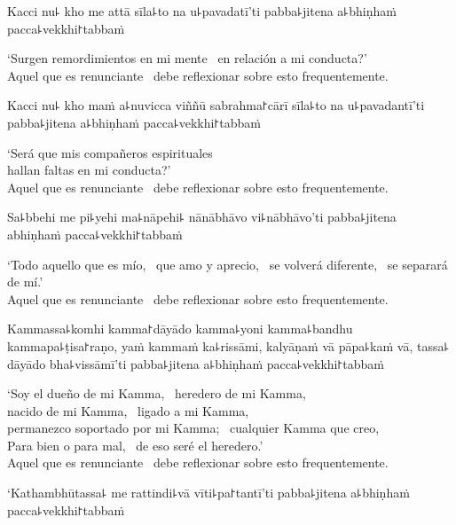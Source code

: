 \clearpage

Kacci nu꜕ kho me attā sīla꜕to na u꜕pavadatī'ti pabba꜕jitena a꜕bhiṇhaṁ pacca꜕vekkhi꜓tabbaṁ

\begin{english}
  `Surgen remordimientos en mi mente \pause\ en relación a mi conducta?' \pause\\
  Aquel que es renunciante \pause\ debe reflexionar sobre esto frequentemente.
\end{english}

Kacci nu꜕ kho maṁ a꜕nuvicca viññū sabrahma꜓cārī sīla꜕to na u꜕pavadantī'ti pabba꜕jitena a꜕bhiṇhaṁ pacca꜕vekkhi꜓tabbaṁ

\begin{english}
  `Será que mis compañeros espirituales \pause\\
  hallan faltas en mi conducta?' \pause\\
  Aquel que es renunciante \pause\ debe reflexionar sobre esto frequentemente.
\end{english}

Sa꜕bbehi me pi꜕yehi ma꜕nāpehi꜕ nānābhāvo vi꜕nābhāvo'ti pabba꜕jitena abhiṇhaṁ pacca꜕vekkhi꜓tabbaṁ

\begin{english}
  `Todo aquello que es mío, \pause\ que amo y aprecio, \pause\ se volverá diferente, \pause\ se separará de mí.' \pause\\
  Aquel que es renunciante \pause\ debe reflexionar sobre esto frequentemente.
\end{english}

Kammassa꜕komhi kamma꜓dāyādo kamma꜕yoni kamma꜕bandhu kammapa꜕ṭisa꜓raṇo, yaṁ kammaṁ ka꜕rissāmi, kalyāṇaṁ vā pāpa꜕kaṁ vā, tassa꜕ dāyādo bha꜕vissāmī'ti pabba꜕jitena a꜕bhiṇhaṁ pacca꜕vekkhi꜓tabbaṁ

\begin{english}
  `Soy el dueño de mi Kamma, \pause\ heredero de mi Kamma, \pause\\
  nacido de mi Kamma, \pause\ ligado a mi Kamma, \pause\\
  permanezco soportado por mi Kamma; \pause\ cualquier Kamma que creo, \pause\\
  Para bien o para mal, \pause\ de eso seré el heredero.' \pause\\
  Aquel que es renunciante \pause\ debe reflexionar sobre esto frequentemente.
\end{english}

\clearpage

`Kathambhūtassa꜕ me rattindi꜕vā vīti꜕pa꜓tantī'ti pabba꜕jitena a꜕bhiṇhaṁ pacca꜕vekkhi꜓tabbaṁ

